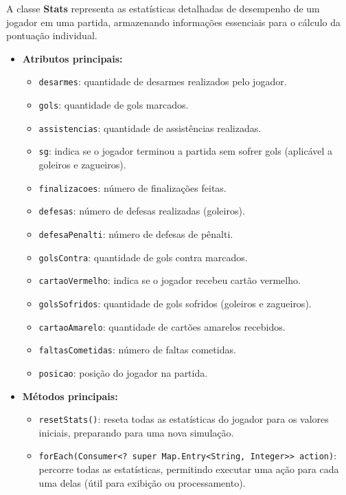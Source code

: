 \documentclass[12pt]{article}
\begin{document}
A classe \textbf{Stats} representa as estatísticas detalhadas de desempenho de um jogador em uma partida, armazenando informações essenciais para o cálculo da pontuação individual.

\begin{itemize}
  \item \textbf{Atributos principais:}
        \begin{itemize}
          \item \texttt{desarmes}: quantidade de desarmes realizados pelo jogador.
          \item \texttt{gols}: quantidade de gols marcados.
          \item \texttt{assistencias}: quantidade de assistências realizadas.
          \item \texttt{sg}: indica se o jogador terminou a partida sem sofrer gols (aplicável a goleiros e zagueiros).
          \item \texttt{finalizacoes}: número de finalizações feitas.
          \item \texttt{defesas}: número de defesas realizadas (goleiros).
          \item \texttt{defesaPenalti}: número de defesas de pênalti.
          \item \texttt{golsContra}: quantidade de gols contra marcados.
          \item \texttt{cartaoVermelho}: indica se o jogador recebeu cartão vermelho.
          \item \texttt{golsSofridos}: quantidade de gols sofridos (goleiros e zagueiros).
          \item \texttt{cartaoAmarelo}: quantidade de cartões amarelos recebidos.
          \item \texttt{faltasCometidas}: número de faltas cometidas.
          \item \texttt{posicao}: posição do jogador na partida.
        \end{itemize}
  \item \textbf{Métodos principais:}
        \begin{itemize}
          \item \texttt{resetStats()}: reseta todas as estatísticas do jogador para os valores iniciais, preparando para uma nova simulação.
          \item \texttt{forEach(Consumer<? super Map.Entry<String, Integer>> action)}: percorre todas as estatísticas, permitindo executar uma ação para cada uma delas (útil para exibição ou processamento).
        \end{itemize}
\end{itemize}
\end{document}
